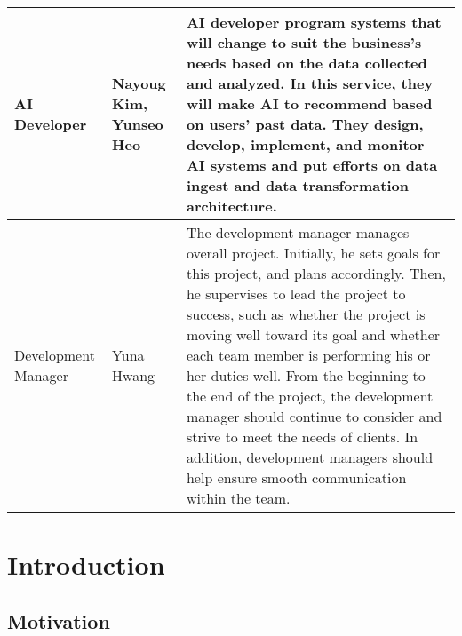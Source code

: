 \documentclass[conference]{IEEEtran}
\begin{document}
\begin{table}[hbt!]
\begin{tabular}{|p{}|p{}|p{}|}
\cline{1-3} 
\hline

AI Developer&Nayoug Kim, Yunseo Heo&AI developer program systems that will change to suit the business’s needs based on the data collected and analyzed. In this service, they will make AI to recommend based on users’ past data. They design, develop, implement, and monitor AI systems and put efforts on data ingest and data transformation architecture.\\
\hline
Development Manager&Yuna Hwang&The development manager manages overall project. Initially, he sets goals for this project, and plans accordingly. Then, he supervises to lead the project to success, such as whether the project is moving well toward its goal and whether each team member is performing his or her duties well. From the beginning to the end of the project, the development manager should continue to consider and strive to meet the needs of clients. In addition, development managers should help ensure smooth communication within the team.\\
\hline
\end{tabular}
\end{table}

\section{Introduction}

\subsection{Motivation}
\end{document}
